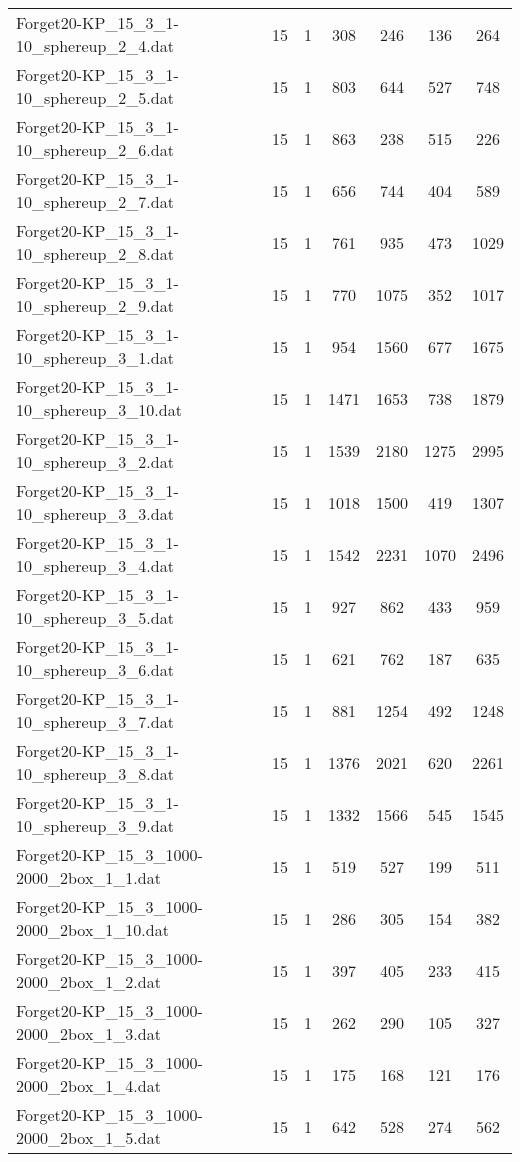 \begin{table}[!ht]
\begin{tabular}{lcccccc}
Forget20-KP\_15\_3\_1-10\_sphereup\_2\_4.dat & 15 & 1 & 308 & 246 & 136 & 264 \\
Forget20-KP\_15\_3\_1-10\_sphereup\_2\_5.dat & 15 & 1 & 803 & 644 & 527 & 748 \\
Forget20-KP\_15\_3\_1-10\_sphereup\_2\_6.dat & 15 & 1 & 863 & 238 & 515 & 226 \\
Forget20-KP\_15\_3\_1-10\_sphereup\_2\_7.dat & 15 & 1 & 656 & 744 & 404 & 589 \\
Forget20-KP\_15\_3\_1-10\_sphereup\_2\_8.dat & 15 & 1 & 761 & 935 & 473 & 1029 \\
Forget20-KP\_15\_3\_1-10\_sphereup\_2\_9.dat & 15 & 1 & 770 & 1075 & 352 & 1017 \\
Forget20-KP\_15\_3\_1-10\_sphereup\_3\_1.dat & 15 & 1 & 954 & 1560 & 677 & 1675 \\
Forget20-KP\_15\_3\_1-10\_sphereup\_3\_10.dat & 15 & 1 & 1471 & 1653 & 738 & 1879 \\
Forget20-KP\_15\_3\_1-10\_sphereup\_3\_2.dat & 15 & 1 & 1539 & 2180 & 1275 & 2995 \\
Forget20-KP\_15\_3\_1-10\_sphereup\_3\_3.dat & 15 & 1 & 1018 & 1500 & 419 & 1307 \\
Forget20-KP\_15\_3\_1-10\_sphereup\_3\_4.dat & 15 & 1 & 1542 & 2231 & 1070 & 2496 \\
Forget20-KP\_15\_3\_1-10\_sphereup\_3\_5.dat & 15 & 1 & 927 & 862 & 433 & 959 \\
Forget20-KP\_15\_3\_1-10\_sphereup\_3\_6.dat & 15 & 1 & 621 & 762 & 187 & 635 \\
Forget20-KP\_15\_3\_1-10\_sphereup\_3\_7.dat & 15 & 1 & 881 & 1254 & 492 & 1248 \\
Forget20-KP\_15\_3\_1-10\_sphereup\_3\_8.dat & 15 & 1 & 1376 & 2021 & 620 & 2261 \\
Forget20-KP\_15\_3\_1-10\_sphereup\_3\_9.dat & 15 & 1 & 1332 & 1566 & 545 & 1545 \\
Forget20-KP\_15\_3\_1000-2000\_2box\_1\_1.dat & 15 & 1 & 519 & 527 & 199 & 511 \\
Forget20-KP\_15\_3\_1000-2000\_2box\_1\_10.dat & 15 & 1 & 286 & 305 & 154 & 382 \\
Forget20-KP\_15\_3\_1000-2000\_2box\_1\_2.dat & 15 & 1 & 397 & 405 & 233 & 415 \\
Forget20-KP\_15\_3\_1000-2000\_2box\_1\_3.dat & 15 & 1 & 262 & 290 & 105 & 327 \\
Forget20-KP\_15\_3\_1000-2000\_2box\_1\_4.dat & 15 & 1 & 175 & 168 & 121 & 176 \\
Forget20-KP\_15\_3\_1000-2000\_2box\_1\_5.dat & 15 & 1 & 642 & 528 & 274 & 562 \\

\end{tabular}
\end{table}
